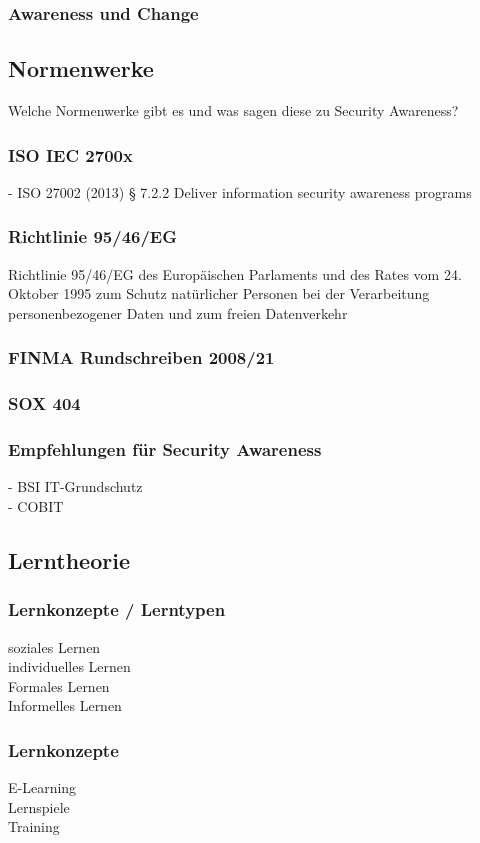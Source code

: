 \documentclass[../../main.tex]{subfiles}
\begin{document}
\subsubsection{Awareness und Change}
\subsection{Normenwerke}
  Welche Normenwerke gibt es und was sagen diese zu Security Awareness?
\subsubsection{ISO IEC 2700x}
    - ISO 27002 (2013) § 7.2.2 Deliver information security awareness programs
\subsubsection{Richtlinie 95/46/EG}
Richtlinie 95/46/EG des Europäischen Parlaments und des Rates vom 24. Oktober 1995 zum Schutz natürlicher Personen bei der Verarbeitung personenbezogener Daten und zum freien Datenverkehr
\subsubsection{FINMA Rundschreiben 2008/21}
\subsubsection{SOX 404}
\subsubsection{Empfehlungen für Security Awareness}
  - BSI IT-Grundschutz\\
  - COBIT
\subsection{Lerntheorie}
\subsubsection{Lernkonzepte / Lerntypen}
    soziales Lernen \\
    individuelles Lernen \\
    Formales Lernen \\
    Informelles Lernen
\subsubsection{Lernkonzepte}
    E-Learning \\
    Lernspiele \\
    Training
\end{document}

